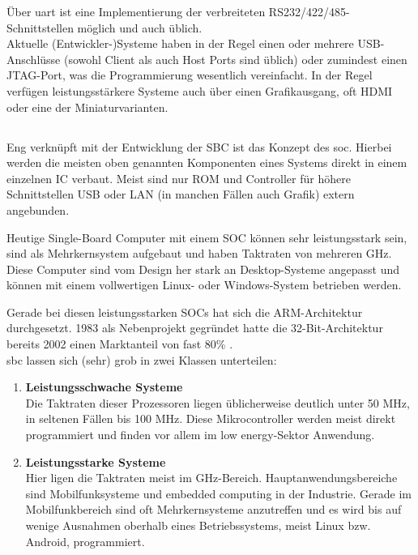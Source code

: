 Über \gls{uart} ist eine Implementierung der verbreiteten RS232/422/485-Schnittstellen möglich und auch üblich.\\

Aktuelle (Entwickler-)Systeme haben in der Regel einen oder mehrere USB-Anschlüsse (sowohl Client als auch Host Ports sind üblich) oder zumindest einen JTAG-Port, was die Programmierung wesentlich vereinfacht. In der Regel verfügen leistungsstärkere Systeme auch über einen Grafikausgang, oft HDMI oder eine der Miniaturvarianten.


\subsection{}
Eng verknüpft mit der Entwicklung der SBC ist das Konzept des \gls{soc}. Hierbei werden die meisten oben genannten Komponenten eines Systems direkt in einem einzelnen IC verbaut. Meist sind nur ROM und Controller für höhere Schnittstellen USB oder LAN (in manchen Fällen auch Grafik) extern angebunden.

Heutige Single-Board Computer mit einem SOC können sehr leistungsstark sein, sind als Mehrkernsystem aufgebaut und haben Taktraten von mehreren GHz. Diese Computer sind vom Design her stark an Desktop-Systeme angepasst und können mit einem vollwertigen Linux- oder Windows-System betrieben werden.

Gerade bei diesen leistungsstarken SOCs hat sich die ARM-Architektur durchgesetzt. 1983 als Nebenprojekt gegründet hatte die 32-Bit-Architektur bereits 2002 einen Marktanteil von fast 80\% \cite{stiller2002}.\\

\noindent \gls{sbc} lassen sich (sehr) grob in zwei Klassen unterteilen:

\begin{enumerate}
\item \textbf{Leistungsschwache Systeme}\\
Die Taktraten dieser Prozessoren liegen üblicherweise deutlich unter 50 MHz, in seltenen Fällen bis 100 MHz. Diese Mikrocontroller werden meist direkt programmiert und finden vor allem im low energy-Sektor Anwendung.
\item \textbf{Leistungsstarke Systeme}\\
Hier ligen die Taktraten meist im GHz-Bereich. Hauptanwendungsbereiche sind Mobilfunksysteme und embedded computing in der Industrie. Gerade im Mobilfunkbereich sind oft Mehrkernsysteme anzutreffen und es wird bis auf wenige Ausnahmen oberhalb eines Betriebssystems, meist Linux bzw. Android, programmiert.
\end{enumerate}


